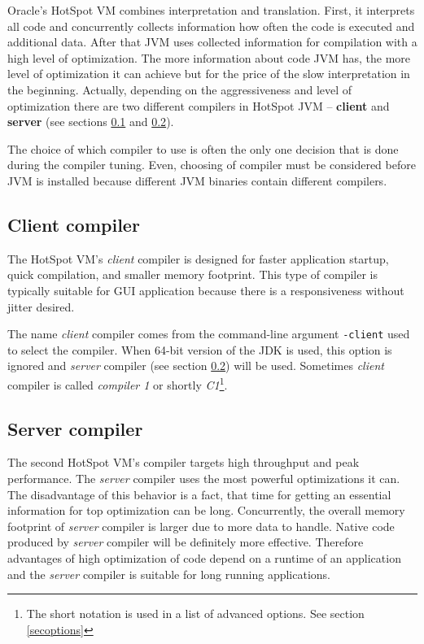 \documentclass[
  digital, %
  oneside,
  notable, %
  nolof,     %
  nolot     %
]{fithesis3}
\begin{document}
Oracle's HotSpot VM combines interpretation and translation. First, it interprets all code and concurrently collects information how often the code is executed and additional data. After that JVM uses collected information for compilation with a high level of optimization. The more information about code JVM has, the more level of optimization it can achieve but for the price of the slow interpretation in the beginning. Actually, depending on the aggressiveness and level of optimization there are two different compilers in HotSpot JVM -- \textbf{client} and \textbf{server} (see sections \ref{clientcomp} and \ref{servercomp}).

The choice of which compiler to use is often the only one decision that is done during the compiler tuning. Even, choosing of compiler must be considered before JVM is installed because different JVM binaries contain different compilers. \cite{scott}

\subsection{Client compiler}\label{clientcomp}
The HotSpot VM's \textit{client} compiler is designed for faster application startup, quick compilation, and smaller memory footprint. This type of compiler is typically suitable for GUI application because there is a responsiveness without jitter desired. \cite{hunt}

The name \textit{client} compiler comes from the command-line argument \texttt{-client} used to select the compiler. When 64-bit version of the JDK is used, this option is ignored and \textit{server} compiler (see section \ref{servercomp}) will be used. Sometimes \textit{client} compiler is called \textit{compiler 1} or shortly \textit{C1}\footnote{The short notation is used in a list of advanced options. See section \ref{secoptions}}. \cite{scott} \cite{java}
\subsection{Server compiler}\label{servercomp}
The second HotSpot VM's compiler targets high throughput and peak performance. The \textit{server} compiler uses the most powerful optimizations it can. The disadvantage of this behavior is a fact, that time for getting an essential information for top optimization can be long. Concurrently, the overall memory footprint of \textit{server} compiler is larger due to more data to handle. Native code produced by \textit{server} compiler will be definitely more effective. Therefore advantages of high optimization of code depend on a runtime of an application and the \textit{server} compiler is suitable for long running applications. \cite{hunt}
\end{document}
